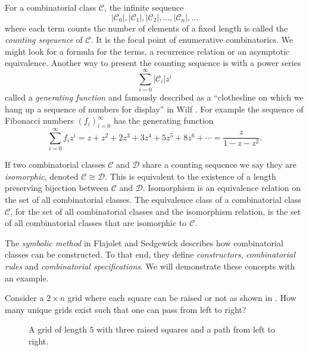 For a combinatorial class $\mathcal{C}$, the infinite sequence 
\[
    |\mathcal{C}_0|, |\mathcal{C}_1|, |\mathcal{C}_2|,\dotsc,|\mathcal{C}_n|,\dotsc
\]
where each term counts the number of elements of a fixed length is called the \emph{counting seqeuence} of $\mathcal{C}$. It is the focal point of enumerative combinatorics. We might look for a formula for the terms, a recurrence relation or an asymptotic equivalence. Another way to present the counting sequence is with a power series
\[
    \sum_{i=0}^\infty |\mathcal{C}_i|z^i
\]
called a \emph{generating function} and famously described as a ``clothesline on which we hang up a sequence of numbers for display'' in Wilf \cite{wilf:gf}. For example the sequence of Fibonacci numbers $\left(f_i\right)_{i=0}^\infty$ has the generating function
\[
    \sum_{i=0}^\infty f_iz^i =  z + z^2 + 2z^3 + 3z^4 + 5z^5 + 8z^6 + \dotsb = \frac{z}{1-z-z^2}.
\]

If two combinatorial classes $\mathcal{C}$ and $\mathcal{D}$ share a counting sequence we say they are \emph{isomorphic}, denoted $\mathcal{C} \cong \mathcal{D}$. This is equivalent to the existence of a length preserving bijection between $\mathcal{C}$ and $\mathcal{D}$. Isomorphism is an equivalence relation on the set of all combinatorial classes. The equivalence class of a combinatorial class $\mathcal{C}$, for the set of all combinatorial classes and the isomorphism relation, is the set of all combinatorial classes that are isomorphic to $\mathcal{C}$.

The \emph{symbolic method} in Flajolet and Sedgewick \cite{flajolet:ac} describes how combinatorial classes can be constructed. To that end, they define \emph{constructors}, \emph{combinatorial rules} and \emph{combinatorial specifications}. We will demonstrate these concepts with an example. 

Consider a $2 \times n$ grid where each square can be raised or not as shown in . How many unique grids exist such that one can pass from left to right?

\begin{figure}[ht!]
    \centering
    
    \caption{A grid of length $5$ with three raised squares and a path from left to right.}
    \label{fig:raised_grid}
\end{figure}

